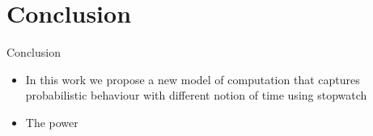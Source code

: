 \documentclass{beamer}
\begin{document}
     \section{Conclusion}
     \begin{frame}{Conclusion}
     \begin{itemize}
      \item In this work we propose a new model of computation that captures probabilistic behaviour with different notion of time using stopwatch
      \item The power
      \end{itemize}
     \end{frame}
\end{document}
